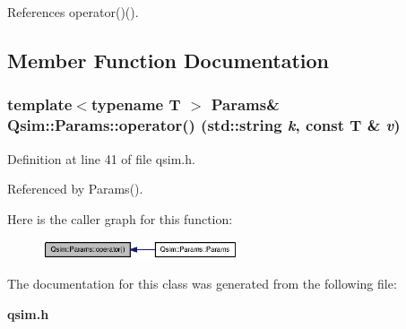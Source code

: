 References operator()().

\subsection{Member Function Documentation}
\subsubsection[{operator()}]{\setlength{\rightskip}{0pt plus 5cm}template$<$typename T $>$ {\bf Params}\& Qsim::Params::operator() (std::string {\em k}, \/  const T \& {\em v})\hspace{0.3cm}{\tt  [inline]}}\label{classQsim_1_1Params_2e4db64ba38696f1082ee6f3faf4b220}




Definition at line 41 of file qsim.h.

Referenced by Params().

Here is the caller graph for this function:\nopagebreak
\begin{figure}[H]
\begin{center}
\leavevmode
\includegraphics[width=163pt]{classQsim_1_1Params_2e4db64ba38696f1082ee6f3faf4b220_icgraph}
\end{center}
\end{figure}


The documentation for this class was generated from the following file:\begin{CompactItemize}
\item 
{\bf qsim.h}\end{CompactItemize}
